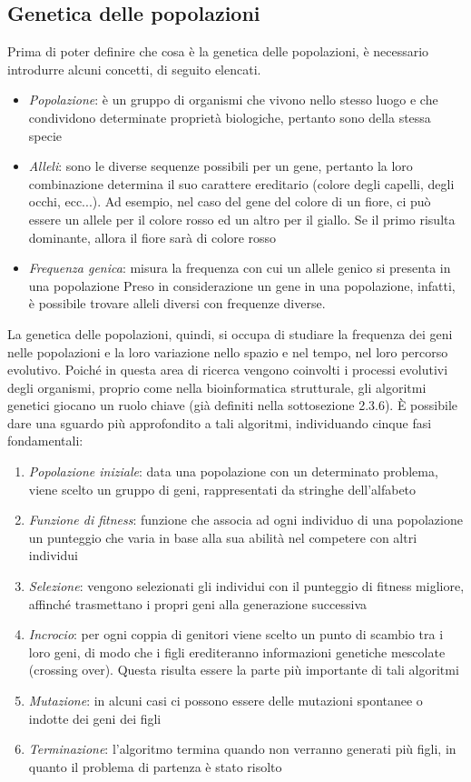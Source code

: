 \subsection{Genetica delle popolazioni}
Prima di poter definire che cosa è la genetica delle popolazioni, è necessario introdurre alcuni concetti, di seguito elencati.
\begin{itemize}
	\item \textit{Popolazione}: è un gruppo di organismi che vivono nello stesso luogo e che condividono determinate proprietà biologiche, pertanto sono della stessa specie
	\item \textit{Alleli}: sono le diverse sequenze possibili per un gene, pertanto la loro combinazione determina il suo carattere ereditario (colore degli capelli, degli occhi, ecc...). Ad esempio, nel caso del gene del colore di un fiore, ci può essere un allele per il colore rosso ed un altro per il giallo. Se il primo risulta dominante, allora il fiore sarà di colore rosso
	\item \textit{Frequenza genica}: misura la frequenza con cui un allele genico si presenta in una popolazione
	\newline
	Preso in considerazione un gene in una popolazione, infatti, è possibile trovare alleli diversi con frequenze diverse.
\end{itemize}
La genetica delle popolazioni, quindi, si occupa di studiare la frequenza dei geni nelle popolazioni e la loro variazione nello spazio e nel tempo, nel loro percorso evolutivo.
\newline
Poiché in questa area di ricerca vengono coinvolti i processi evolutivi degli organismi, proprio come nella bioinformatica strutturale, gli algoritmi genetici giocano un ruolo chiave (già definiti nella sottosezione 2.3.6). 
\newline
\`E possibile dare una sguardo più approfondito a tali algoritmi, individuando cinque fasi fondamentali:
\begin{enumerate}
	\item \textit{Popolazione iniziale}: data una popolazione con un determinato problema, viene scelto un gruppo di geni, rappresentati da stringhe dell'alfabeto
	\item \textit{Funzione di fitness}: funzione che associa ad ogni individuo di una popolazione un punteggio che varia in base alla sua abilità nel competere con altri individui
	\item \textit{Selezione}: vengono selezionati gli individui con il punteggio di fitness migliore, affinché trasmettano i propri geni alla generazione successiva
	\item \textit{Incrocio}: per ogni coppia di genitori viene scelto un punto di scambio tra i loro geni, di modo che i figli erediteranno informazioni genetiche mescolate (crossing over). Questa risulta essere la parte più importante di tali algoritmi
	\item \textit{Mutazione}: in alcuni casi ci possono essere delle mutazioni spontanee o indotte dei geni dei figli
	\item \textit{Terminazione}: l'algoritmo termina quando non verranno generati più figli, in quanto il problema di partenza è stato risolto
\end{enumerate}

